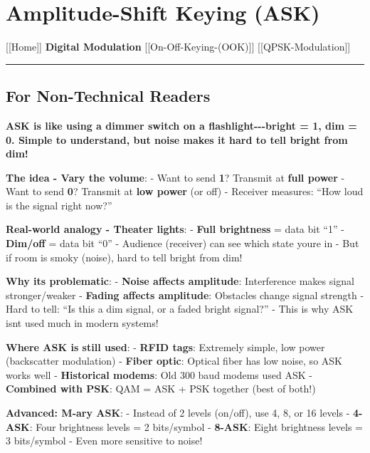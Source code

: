 \section{Amplitude-Shift Keying (ASK)}\label{amplitude-shift-keying-ask}

{[}{[}Home{]}{]} \textbar{} \textbf{Digital Modulation} \textbar{}
{[}{[}On-Off-Keying-(OOK){]}{]} \textbar{} {[}{[}QPSK-Modulation{]}{]}

\begin{center}\rule{0.5\linewidth}{0.5pt}\end{center}

\subsection{\texorpdfstring{ For Non-Technical
Readers}{ For Non-Technical Readers}}\label{for-non-technical-readers}

\textbf{ASK is like using a dimmer switch on a flashlight-\/-\/-bright =
1, dim = 0. Simple to understand, but noise makes it hard to tell bright
from dim!}

\textbf{The idea - Vary the volume}: - Want to send \textbf{1}? Transmit
at \textbf{full power} - Want to send \textbf{0}? Transmit at
\textbf{low power} (or off) - Receiver measures: ``How loud is the
signal right now?''

\textbf{Real-world analogy - Theater lights}: - \textbf{Full brightness}
= data bit ``1'' - \textbf{Dim/off} = data bit ``0'' - Audience
(receiver) can see which state you\textquotesingle re in - But if room
is smoky (noise), hard to tell bright from dim!

\textbf{Why it\textquotesingle s problematic}: - \textbf{Noise affects
amplitude}: Interference makes signal stronger/weaker - \textbf{Fading
affects amplitude}: Obstacles change signal strength - Hard to tell:
``Is this a dim signal, or a faded bright signal?'' - This is why ASK
isn\textquotesingle t used much in modern systems!

\textbf{Where ASK is still used}: - \textbf{RFID tags}: Extremely
simple, low power (backscatter modulation) - \textbf{Fiber optic}:
Optical fiber has low noise, so ASK works well - \textbf{Historical
modems}: Old 300 baud modems used ASK - \textbf{Combined with PSK}: QAM
= ASK + PSK together (best of both!)

\textbf{Advanced: M-ary ASK}: - Instead of 2 levels (on/off), use 4, 8,
or 16 levels - \textbf{4-ASK}: Four brightness levels = 2 bits/symbol -
\textbf{8-ASK}: Eight brightness levels = 3 bits/symbol - Even more
sensitive to noise!

